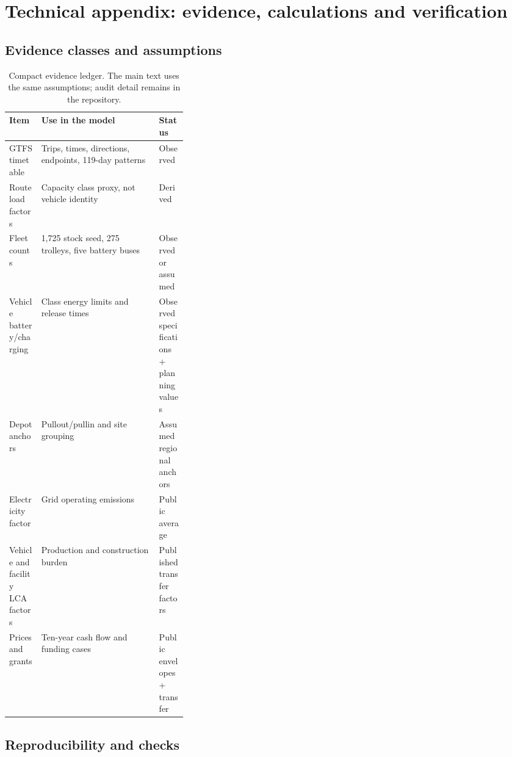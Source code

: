 \documentclass[12pt,letterpaper]{article}
\begin{document}
\clearpage
\appendix
\section{Technical appendix: evidence, calculations and verification}

\subsection{Evidence classes and assumptions}

\begin{table}[h]
\centering
\caption{Compact evidence ledger. The main text uses the same assumptions; audit detail remains in the repository.}
\begin{tabularx}{\linewidth}{@{}>{\raggedright\arraybackslash}p{0.18\linewidth}X>{\raggedright\arraybackslash}p{0.16\linewidth}@{}}
\toprule
Item & Use in the model & Status\\\midrule
GTFS timetable & Trips, times, directions, endpoints, 119-day patterns & Observed\\
Route load factors & Capacity class proxy, not vehicle identity & Derived\\
Fleet counts & 1,725 stock seed, 275 trolleys, five battery buses & Observed or assumed\\
Vehicle battery/charging & Class energy limits and release times & Observed specifications + planning values\\
Depot anchors & Pullout/pullin and site grouping & Assumed regional anchors\\
Electricity factor & Grid operating emissions & Public average\\
Vehicle and facility LCA factors & Production and construction burden & Published transfer factors\\
Prices and grants & Ten-year cash flow and funding cases & Public envelopes + transfer\\
\bottomrule
\end{tabularx}
\end{table}

\subsection{Reproducibility and checks}
\end{document}
